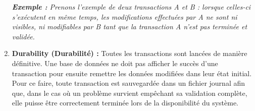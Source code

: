 \begin{enumerate}
\textit{\textbf{Exemple :} Prenons l’exemple de deux transactions A et B : lorsque celles-ci s’exécutent en même temps, les modifications effectuées par A ne sont ni visibles, ni modifiables par B tant que la transaction A n’est pas terminée et validée.}

\item \textbf{Durability (Durabilité) :} Toutes les transactions sont lancées de manière définitive. Une base de données ne doit pas afficher le succès d’une transaction pour ensuite remettre les données modifiées dans leur état initial. Pour ce faire, toute transaction est sauvegardée dans un fichier journal afin que, dans le cas où un problème survient empêchant sa validation complète, elle puisse être correctement terminée lors de la disponibilité du système.
\end{enumerate}